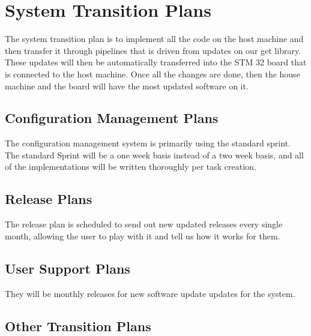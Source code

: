 
\chapter{System Transition Plans}
\label{loc:RequiredWork}
% 

The system transition plan is to implement all the code on the host machine and then transfer it through pipelines that is driven from updates on our get library. These updates will then be automatically transferred into the STM 32 board that is connected to the host machine. Once all the changes are done, then the house machine and the board will have the most updated software on it.

\section{Configuration Management Plans}
\label{loc:STP_ConfigMngtPlans}
% 

The configuration management system is primarily using the standard sprint. The standard Sprint will be a one week basis instead of a two week basis, and all of the implementations will be written thoroughly per task creation.

\section{Release Plans}
\label{loc:STP_ReleasePlans}
% 

The release plan is scheduled to send out new updated releases every single month, allowing the user to play with it and tell us how it works for them.

\section{User Support Plans}
\label{loc:STP_UserSupportPlans}
% 

They will be monthly releases for new software update updates for the system.

\section{Other Transition Plans}
\label{loc:STP_OtherTransitionPlans}
% 

